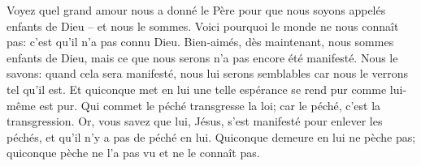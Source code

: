 Voyez quel grand amour nous a donné le Père
	pour que nous soyons appelés enfants de Dieu
	– et nous le sommes.
Voici pourquoi le monde ne nous connaît pas:
	c’est qu’il n’a pas connu Dieu.
Bien-aimés, dès maintenant, nous sommes enfants de Dieu,
	mais ce que nous serons n’a pas encore été manifesté.
Nous le savons: quand cela sera manifesté, nous lui serons semblables
	car nous le verrons tel qu’il est.
Et quiconque met en lui une telle espérance
	se rend pur comme lui-même est pur.
Qui commet le péché transgresse la loi;
	car le péché, c’est la transgression.
Or, vous savez que lui, Jésus, s’est manifesté pour enlever les péchés,
	et qu’il n’y a pas de péché en lui.
Quiconque demeure en lui ne pèche pas;
	quiconque pèche ne l’a pas vu et ne le connaît pas.
